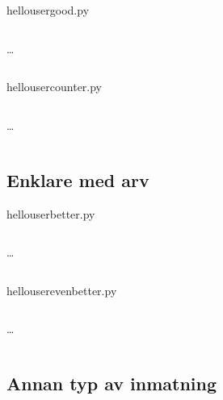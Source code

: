 \begin{frame}[fragile]
  hello\textunderscore user\textunderscore good.py \hrulefill
  \inputminted[autogobble=false,linenos,firstline=18,lastline=25]{python}{examples/hello_user_good.py}
  \dots
  \inputminted[autogobble=false,linenos,firstline=30,lastline=32]{python}{examples/hello_user_good.py}
\end{frame}

\begin{frame}[fragile]
  hello\textunderscore user\textunderscore counter.py \hrulefill
  \inputminted[linenos,firstline=5,lastline=14]{python}{examples/hello_user_counter.py}
  \dots
  \inputminted[autogobble=false,linenos,firstline=32,lastline=34]{python}{examples/hello_user_counter.py}
\end{frame}

\subsection{Enklare med arv}

\begin{frame}[fragile]
  hello\textunderscore user\textunderscore better.py \hrulefill
  \inputminted[linenos,firstline=5,lastline=13]{python}{examples/hello_user_better.py}
  \dots
  \inputminted[linenos,firstline=33,lastline=38]{python}{examples/hello_user_better.py}
\end{frame}

\begin{frame}[fragile]
  hello\textunderscore user\textunderscore even\textunderscore better.py
  \hrulefill
  \inputminted[linenos,firstline=5,lastline=9]{python}{examples/hello_user_even_better.py}
  \dots
  \inputminted[autogobble=false,linenos,firstline=24,lastline=32]{python}{examples/hello_user_even_better.py}
\end{frame}

\subsection{Annan typ av inmatning}

